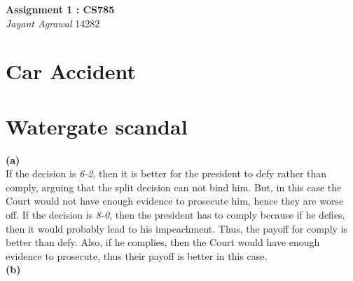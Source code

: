 \documentclass{article}
\begin{document}

\begin{center}
\textbf{\Large Assignment 1 : CS785} \\
\textit{\large Jayant Agrawal}         14282
\end{center}

\section{Car Accident}
\section{Watergate scandal}
\textbf{(a)} \\
If the decision is \emph{6-2}, then it is better for the president to defy rather than comply, arguing that the split decision can not bind him. But, in this case the Court would not have enough evidence to prosecute him, hence they are worse off. If the decision is \emph{8-0}, then the president has to comply because if he defies, then it would probably lead to his impeachment. Thus, the payoff for comply is better than defy. Also, if he complies, then the Court would have enough evidence to prosecute, thus their payoff is better in this case.\\
\textbf{(b)}
\end{document}
